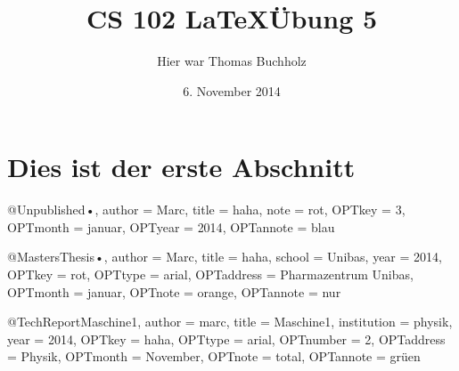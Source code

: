\documentclass{article}
\author{Hier war Thomas Buchholz}
\title{CS 102 \LaTeX  \"Ubung 5}
\date{6. November 2014}
\begin{document}
\maketitle
\section{Dies ist der erste Abschnitt}

@Unpublished{•,
author = {Marc},
title = {haha},
note = {rot},
OPTkey = {3},
OPTmonth = {januar},
OPTyear = {2014},
OPTannote = {blau}
}



@MastersThesis{•,
author = {Marc},
title = {haha},
school = {Unibas},
year = {2014},
OPTkey = {rot},
OPTtype = {arial},
OPTaddress = {Pharmazentrum Unibas},
OPTmonth = {januar},
OPTnote = {orange},
OPTannote = {nur}
}

@TechReport{Maschine1,
author = {marc},
title = {Maschine1},
institution = {physik},
year = {2014},
OPTkey = {haha},
OPTtype = {arial},
OPTnumber = {2},
OPTaddress = {Physik},
OPTmonth = {November},
OPTnote = {total},
OPTannote = {grüen}
}
\end{document}
